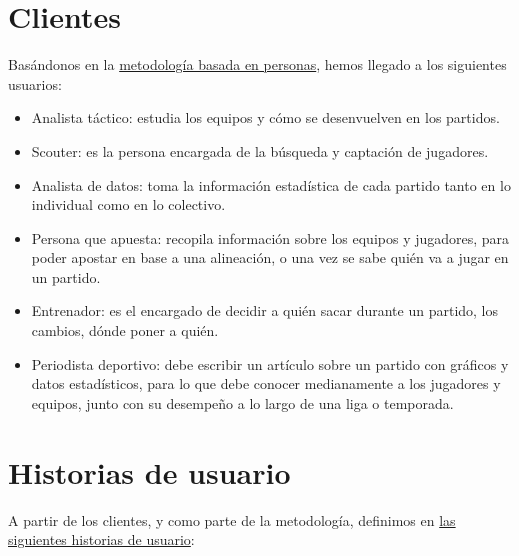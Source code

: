 \section{Clientes}
Basándonos en la \href{https://www.designthinking.services/herramientas-design-thinking/metodo-persona/}{metodología basada en personas}, 
hemos llegado a los siguientes usuarios: 
\begin{itemize}
    \item Analista táctico: estudia los equipos y cómo se desenvuelven en los partidos. 
    \item Scouter: es la persona encargada de la búsqueda y captación 
    de jugadores.
    \item Analista de datos: toma la información estadística de 
    cada partido tanto en lo individual como en lo colectivo. 
    \item Persona que apuesta: recopila información sobre los equipos y jugadores, para poder apostar 
    en base a una alineación, o una vez se sabe quién va a jugar en un partido. 
    \item Entrenador: es el encargado de decidir a quién sacar durante un partido, los 
    cambios, dónde poner a quién.   
    \item Periodista deportivo: debe escribir un artículo sobre un partido con gráficos y datos estadísticos, 
    para lo que debe conocer medianamente a los jugadores y equipos, junto con su desempeño a lo largo de 
    una liga o temporada. 
\end{itemize}

\section{Historias de usuario}  

A partir de los clientes, y como parte de la metodología, definimos en \href{https://github.com/ElenaMerelo/TFG/issues?q=is%3Aopen+is%3Aissue+label%3Auser-story}{las siguientes historias de usuario}: 

